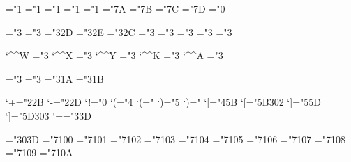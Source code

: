 \mathchardef\intop          ="1
\mathchardef\ointop         ="1
\mathchardef\coprod         ="1
\mathchardef\prod           ="1
\mathchardef\sum            ="1
\mathchardef\braceld        ="\hexexfam 7A 
\mathchardef\bracerd        ="\hexexfam 7B
\mathchardef\bracelu        ="\hexexfam 7C 
\mathchardef\braceru        ="\hexexfam 7D
\mathchardef\infty          ="0

\mathchardef\nearrow        ="3
\mathchardef\searrow        ="3
\mathchardef\nwarrow        ="3\hexexfam 2D
\mathchardef\swarrow        ="3\hexexfam 2E
\mathchardef\Leftrightarrow ="3\hexexfam 2C
\mathchardef\Leftarrow      ="3
\mathchardef\Rightarrow     ="3
\mathchardef\leftrightarrow ="3 
\mathchardef\leftarrow      ="3 
\mathchardef\rightarrow     ="3

\let\gets =\leftarrow 
\let\to   =\rightarrow  

\mathcode`\^^W              ="3
\mathcode`\^^X              ="3
\mathcode`\^^Y              ="3
\mathcode`\^^K              ="3
\mathcode`\^^A              ="3

\def\uparrow                {\delimiter"3\hexexfam 22378 } 
\def\downarrow              {\delimiter"3\hexexfam 23379 } 
\def\updownarrow            {\delimiter"3\hexexfam 6C33F }
\def\Uparrow                {\delimiter"3\hexexfam 2A37E }
\def\Downarrow              {\delimiter"3\hexexfam 2B37F }
\def\Updownarrow            {\delimiter"3\hexexfam 6D377 }

\mathchardef\leftharpoonup    ="3
\mathchardef\leftharpoondown  ="3
\mathchardef\rightharpoonup   ="3\hexexfam 1A
\mathchardef\rightharpoondown ="3\hexexfam 1B

\mathcode`+="2\hexfmfam 2B
\mathcode`-="2\hexfmfam 2D
\mathcode`!="0
\mathcode`(="4    \delcode`(="
\mathcode`)="5    \delcode`)="
\mathcode`[="4\hexfmfam 5B    \delcode`[="\hexfmfam 5B302
\mathcode`]="5\hexfmfam 5D    \delcode`]="\hexfmfam 5D303
\mathcode`=="3\hexfmfam 3D

\mathchardef\Relbar  ="303D %
\mathchardef\Gamma   ="7100
\mathchardef\Delta   ="7101
\mathchardef\Theta   ="7102
\mathchardef\Lambda  ="7103
\mathchardef\Xi      ="7104
\mathchardef\Pi      ="7105
\mathchardef\Sigma   ="7106
\mathchardef\Upsilon ="7107
\mathchardef\Phi     ="7108
\mathchardef\Psi     ="7109
\mathchardef\Omega   ="710A

